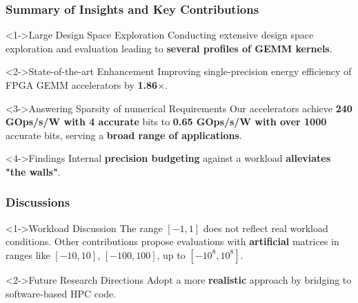 \begin{frame}
    \frametitle{Summary of Insights and Key Contributions}
        \begin{alertblock}<1->{Large Design Space Exploration}
		Conducting extensive design space exploration and evaluation leading to \textbf{several profiles of GEMM kernels}.
        \end{alertblock}
	\vspace{-3mm}

        \begin{block}<2->{State-of-the-art Enhancement}
		Improving single-precision energy efficiency of FPGA GEMM accelerators by \textbf{1.86$\times$}.
        \end{block}
	\vspace{-3mm}

        \begin{block}<3->{Answering Sparsity of numerical Requirements}
		Our accelerators achieve \textbf{240 GOps/s/W with 4 accurate} bits to \textbf{0.65 GOps/s/W with over 1000} accurate bits, serving a \textbf{broad range of applications}.
        \end{block}
	\vspace{-3mm}

        \begin{exampleblock}<4->{Findings}
		Internal \textbf{precision budgeting} against a workload \textbf{alleviates "the walls"}.
        \end{exampleblock}

\end{frame}
\begin{frame}
    \frametitle{Discussions}


   \begin{block}<1->{Workload Discussion}
	   The range \([-1, 1]\) does not reflect real workload conditions. Other contributions propose evaluations with \textbf{artificial} matrices in ranges like \([-10, 10]\), \([-100, 100]\), up to \([-10^{8}, 10^{8}]\).
    \end{block}

        \begin{block}<2->{Future Research Directions}
            Adopt a more \textbf{realistic} approach by bridging to software-based HPC code.
        \end{block}
\end{frame}
